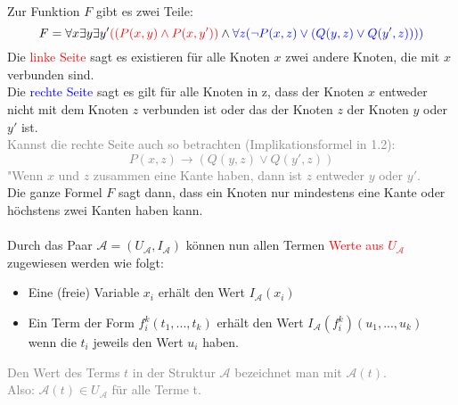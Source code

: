 \documentclass{article}
\begin{document}
	\\
	Zur Funktion $F$ gibt es zwei Teile:
	\[F = \forall x \exists y \exists y' \textcolor{red}{((P(x,y)\wedge P(x,y'))}\wedge \textcolor{blue}{\forall z (\neg P(x,z)\vee(Q(y,z)\vee Q(y',z))))}\]
	Die \textcolor{red}{linke Seite} sagt es existieren für alle Knoten $x$ zwei andere Knoten, die mit $x$ verbunden sind. \\
	Die \textcolor{blue}{rechte Seite} sagt es gilt für alle Knoten in z, dass der Knoten $x$ entweder nicht mit dem Knoten $z$ verbunden ist oder das der Knoten $z$ der Knoten $y$ oder $y'$ ist. \\
	\textcolor{gray}{Kannst die rechte Seite auch so betrachten (Implikationsformel in 1.2): 
	\[P(x,z) \rightarrow (Q(y,z)\vee Q(y',z))\]
		 "Wenn $x$ und $z$ zusammen eine Kante haben, dann ist $z$ entweder $y$ oder $y'$.
	} \\
	Die ganze Formel $F$ sagt dann, dass ein Knoten nur mindestens eine Kante oder höchstens zwei Kanten haben kann. \\
	\\
	Durch das Paar $\mathcal{A} = (U_\mathcal{A}, I_\mathcal{A})$ können nun allen Termen \textcolor{red}{Werte aus $U_\mathcal{A}$} zugewiesen werden wie folgt:
	\begin{itemize}
		\item Eine (freie) Variable $x_i$ erhält den Wert $I_\mathcal{A}(x_i)$
		\item Ein Term der Form $f^k_i(t_1,..., t_k)$ erhält den Wert $I_\mathcal{A}(f^k_i)(u_1,...,u_k)$ \\
		wenn die $t_i$ jeweils den Wert $u_i$ haben.
	\end{itemize}
	\textcolor{gray}{
		Den Wert des Terms $t$ in der Struktur $\mathcal{A}$ bezeichnet man mit $\mathcal{A}(t)$. \\
		Also: $\mathcal{A}(t) \in U_\mathcal{A}$ für alle Terme t.
	} \\
\end{document}
